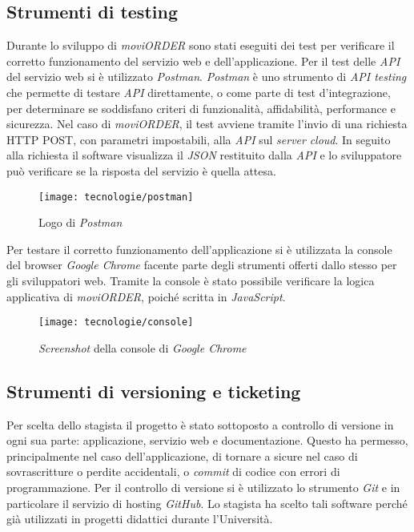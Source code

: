 \subsection{Strumenti di testing}

Durante lo sviluppo di \textit{moviORDER} sono stati eseguiti dei test per verificare il corretto funzionamento del servizio web e dell'applicazione. Per il test delle \textit{API} del servizio web si è utilizzato \textit{Postman}. \textit{Postman} è uno strumento di \textit{API testing} che permette di testare \textit{API} direttamente, o come parte di test d'integrazione, per determinare se soddisfano criteri di funzionalità, affidabilità, performance e sicurezza. Nel caso di \textit{moviORDER}, il test avviene tramite l'invio di una richiesta HTTP POST, con parametri impostabili, alla \textit{API} sul \textit{server} \textit{cloud}. In seguito alla richiesta il software visualizza il \textit{JSON} restituito dalla \textit{API} e lo sviluppatore può verificare se la risposta del servizio è quella attesa.

\begin{figure}[!h] 
    \centering 
    \texttt{[image: tecnologie/postman]} 
    \caption{Logo di \textit{Postman}}
\end{figure}

Per testare il corretto funzionamento dell'applicazione si è utilizzata la console del browser \textit{Google Chrome} facente parte degli strumenti offerti dallo stesso per gli sviluppatori web. Tramite la console è stato possibile verificare la logica applicativa di \textit{moviORDER}, poiché scritta in \textit{JavaScript}.

\begin{figure}[!h] 
    \centering 
    \texttt{[image: tecnologie/console]} 
    \caption{\textit{Screenshot} della console di \textit{Google Chrome}}
\end{figure}

\newpage

\subsection{Strumenti di versioning e ticketing}

Per scelta dello stagista il progetto è stato sottoposto a controllo di versione in ogni sua parte: applicazione, servizio web e documentazione. Questo ha permesso, principalmente nel caso dell'applicazione, di tornare a  sicure nel caso di sovrascritture o perdite accidentali, o \textit{commit} di codice con errori di programmazione. Per il controllo di versione si è utilizzato lo strumento \textit{Git} e in particolare il servizio di hosting \textit{GitHub}. Lo stagista ha scelto tali software perché già utilizzati in progetti didattici durante l'Università.

